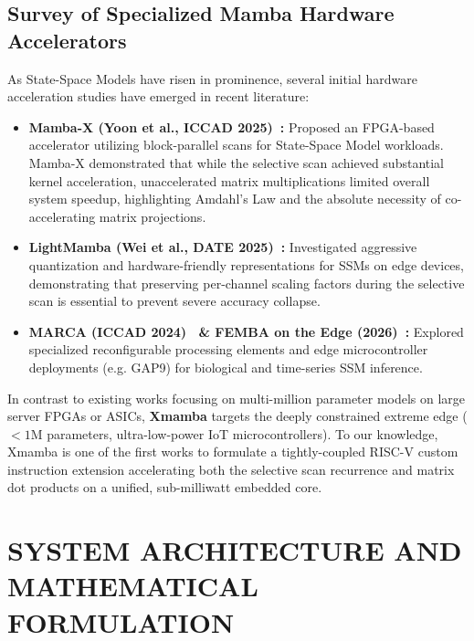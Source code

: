 \documentclass[11pt,a4paper,oneside]{report}
\begin{document}
\section{Survey of Specialized Mamba Hardware Accelerators}
As State-Space Models have risen in prominence, several initial hardware acceleration studies have emerged in recent literature:
\begin{itemize}
    \item \textbf{Mamba-X (Yoon et al., ICCAD 2025)~\cite{mamba_x_2025}:} Proposed an FPGA-based accelerator utilizing block-parallel scans for State-Space Model workloads. Mamba-X demonstrated that while the selective scan achieved substantial kernel acceleration, unaccelerated matrix multiplications limited overall system speedup, highlighting Amdahl's Law and the absolute necessity of co-accelerating matrix projections.
    \item \textbf{LightMamba (Wei et al., DATE 2025)~\cite{lightmamba2025}:} Investigated aggressive quantization and hardware-friendly representations for SSMs on edge devices, demonstrating that preserving per-channel scaling factors during the selective scan is essential to prevent severe accuracy collapse.
    \item \textbf{MARCA (ICCAD 2024)~\cite{marca2024} \& FEMBA on the Edge (2026)~\cite{femba2026}:} Explored specialized reconfigurable processing elements and edge microcontroller deployments (e.g. GAP9) for biological and time-series SSM inference.
\end{itemize}

In contrast to existing works focusing on multi-million parameter models on large server FPGAs or ASICs, \textbf{Xmamba} targets the deeply constrained extreme edge ($< 1\text{M}$ parameters, ultra-low-power IoT microcontrollers). To our knowledge, Xmamba is one of the first works to formulate a tightly-coupled RISC-V custom instruction extension accelerating both the selective scan recurrence and matrix dot products on a unified, sub-milliwatt embedded core.

\chapter{SYSTEM ARCHITECTURE AND MATHEMATICAL FORMULATION}
\label{Chapter3}
\rhead{}
\end{document}
